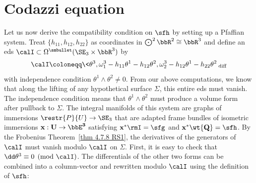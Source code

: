 \section{Codazzi equation}

Let us now derive the compatibility condition on $\sfh$ by setting up a Pfaffian system. Treat $\{h_{11},h_{12},h_{22}\}$ as coordinates in $\bigodot^2 \bbR^2\cong\bbR^3$ and define an \gls{eds} $\calI\subset \Omega^{\smbullet }(\SE_3\times \bbR^3)$ by
\[\calI\coloneqq \<\theta^3,\omega_1^3-h_{11}\theta^1-h_{12}\theta^2,\omega_2^3-h_{12}\theta^1-h_{22}\theta^2\>_{\mathrm{diff}}\]
with independence condition $\theta^1\wedge\theta^2\neq 0$.
From our above computations, we know that along the lifting of any hypothetical surface $\Sigma$, this entire \gls{eds} must vanish. The independence condition means that $\theta^1\wedge\theta^2$ must produce a volume form after pullback to $\Sigma$. The integral manifolds of this system are graphs of immersions $\restr{P}{U}\to \SE_3$ that are adapted frame bundles of isometric immersions $\bf{x}:U\to \bbE^3$ satisfying $\bf{x}^\ast \rmI=\sfg$ and $\bf{x}^\ast \wt{Q}=\sfh$. By the Frobenius Theorem~\ref{thm 4.7.8 RS1}, the derivatives of the generators of $\calI$ must vanish modulo $\calI$ on $\Sigma$. First, it is easy to check that $\dd\theta^3\equiv 0 \pmod{\calI}$. The differentials of the other two forms can be combined into a column-vector and rewritten modulo $\calI$ using the definition of $\sfh$:
